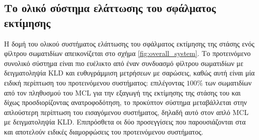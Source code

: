 \subsection{Το ολικό σύστημα ελάττωσης του σφάλματος εκτίμησης}

Η δομή του ολικού συστήματος ελάττωσης του σφάλματος εκτίμησης της στάσης ενός
φίλτρου σωματιδίων απεικονίζεται στο σχήμα \ref{fig:overall_system}.  Το
προτεινόμενο συνολικό σύστημα είναι πιο ευέλικτο από έναν συνδυασμό φίλτρου
σωματιδίων με δειγματοληψία KLD και ευθυγράμμιση μετρήσεων με σαρώσεις, καθώς
αυτή είναι μία ειδική περίπτωση του προτεινόμενου συστήματος: επιλέγοντας
$100\%$ των σωματιδίων από τον πληθυσμού του MCL για την εξαγωγή της εκτίμησης
της στάσης του και δίχως προσδιορίζοντας ανατροφοδότηση, το προκύπτον σύστημα
μεταβάλλεται στην απλούστερη περίπτωση του εισαγόμενου συστήματος, δηλαδή αυτό
στον απλό MCL με δειγματοληψία KLD. Επιπρόσθετα οι δύο προσεγγίσεις που
παρουσιάζονται στα \cite{Vasiljevic2016b} και \cite{Peng2018a} αποτελούν
ειδικές διαμορφώσεις του προτεινόμενου συστήματος.

